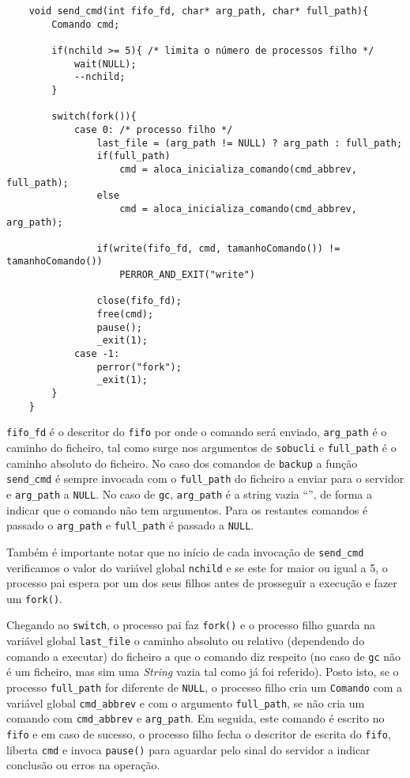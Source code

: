 \documentclass[a4paper,12pt,titlepage,draft,portuguese]{article}
\begin{document}
	\begin{verbatim}
	void send_cmd(int fifo_fd, char* arg_path, char* full_path){
		Comando cmd;

		if(nchild >= 5){ /* limita o número de processos filho */
			wait(NULL);
			--nchild;
		}

		switch(fork()){
			case 0: /* processo filho */
				last_file = (arg_path != NULL) ? arg_path : full_path;
				if(full_path)
					cmd = aloca_inicializa_comando(cmd_abbrev, full_path);
				else
					cmd = aloca_inicializa_comando(cmd_abbrev, arg_path);
				
				if(write(fifo_fd, cmd, tamanhoComando()) != tamanhoComando())
					PERROR_AND_EXIT("write")
				
				close(fifo_fd);
				free(cmd);
				pause();
				_exit(1);
			case -1:
				perror("fork");
				_exit(1);
		}
	}
	\end{verbatim}

\texttt{fifo\_fd} é o descritor do \texttt{fifo} por onde o comando será enviado, \texttt{arg\_path} é o caminho do ficheiro, tal como surge nos argumentos de \texttt{sobucli} e \texttt{full\_path} é o caminho absoluto do ficheiro. No caso dos comandos de \texttt{backup} a função \texttt{send\_cmd} é sempre invocada com o \texttt{full\_path} do ficheiro a enviar para o servidor e \texttt{arg\_path} a \texttt{NULL}. No caso de \texttt{gc},  \texttt{arg\_path} é a string vazia ``'', de forma a indicar que o comando não tem argumentos. Para os restantes comandos é passado o \texttt{arg\_path} e \texttt{full\_path} é passado a \texttt{NULL}.

Também é importante notar que no início de cada invocação de \texttt{send\_cmd} verificamos o valor do variável global \texttt{nchild} e se este for maior ou igual a 5, o processo pai espera por um dos seus filhos antes de prosseguir a execução e fazer um \texttt{fork()}.

Chegando ao \texttt{switch}, o processo pai faz \texttt{fork()} e o processo filho guarda na variável global \texttt{last\_file} o caminho absoluto ou relativo (dependendo do comando a executar) do ficheiro a que o comando diz respeito (no caso de \texttt{gc} não é um ficheiro, mas sim uma \emph{String} vazia tal como já foi referido). Posto isto, se o processo \texttt{full\_path} for diferente de \texttt{NULL}, o processo filho cria um \texttt{Comando} com a variável global \texttt{cmd\_abbrev} e com o argumento \texttt{full\_path}, se não cria um comando com \texttt{cmd\_abbrev} e \texttt{arg\_path}. Em seguida, este comando é escrito no \texttt{fifo} e em caso de sucesso, o processo filho fecha o descritor de escrita do \texttt{fifo}, liberta \texttt{cmd} e invoca \texttt{pause()} para aguardar pelo sinal do servidor a indicar conclusão ou erros na operação.
\end{document}

